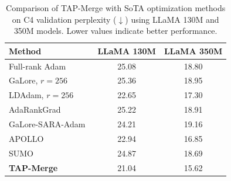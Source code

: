 \begin{table}[t]
\centering\small
\caption{Comparison of TAP-Merge with SoTA optimization methods on C4 validation perplexity ($\downarrow$) using LLaMA 130M and 350M models. Lower values indicate better performance.}
\label{tab:c4_complete}
\begin{tabular}{lcc}
\toprule
Method & LLaMA 130M & LLaMA 350M\\
\midrule
Full-rank Adam~\cite{galore2024} & 25.08 & 18.80\\
GaLore, $r=256$~\cite{galore2024} & 25.36 & 18.95\\
LDAdam, $r=256$~\cite{ldadam2025} & 22.65 & 17.30\\
AdaRankGrad~\cite{adarankgrad2025} & 25.22 & 18.91\\
GaLore-SARA-Adam~\cite{sara2025} & 24.21 & 19.16\\
APOLLO~\cite{apollo2025} & 22.94 & 16.85\\
SUMO~\cite{sumo2025} & 24.87 & 18.69\\
\midrule
\textbf{TAP-Merge} & 21.04 & 15.62\\ \bottomrule
\end{tabular}
\end{table}
